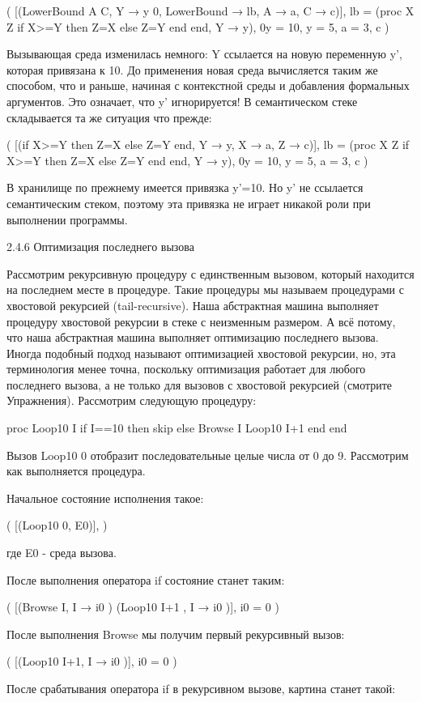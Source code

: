 ( [({LowerBound A C}, {Y → y 0, LowerBound → lb, A → a, C → c})],
{ lb = (proc { X Z} if X>=Y then Z=X else Z=Y end end, {Y → y}),
0y = 10, y = 5, a = 3, c} )

Вызывающая среда изменилась немного: Y ссылается на новую переменную y', которая привязана к 10. До применения новая среда вычисляется таким же способом, что и раньше, начиная с контекстной среды и добавления формальных аргументов. Это означает, что y' игнорируется! В семантическом стеке складывается та же ситуация что прежде:

( [(if X>=Y then Z=X else Z=Y end, {Y → y, X → a, Z → c})],
{ lb = (proc { X Z} if X>=Y then Z=X else Z=Y end end, {Y → y}),
0y = 10, y = 5, a = 3, c} )

В хранилище по прежнему имеется привязка y'=10. Но y' не ссылается семантическим стеком, поэтому эта привязка не играет никакой роли при выполнении программы.

2.4.6 Оптимизация последнего вызова

Рассмотрим рекурсивную процедуру с единственным вызовом, который находится на последнем месте в процедуре. Такие процедуры мы называем процедурами с хвостовой рекурсией (tail-recursive). Наша абстрактная машина выполняет процедуру хвостовой рекурсии в стеке с неизменным размером. А всё потому, что наша абстрактная машина выполняет оптимизацию последнего вызова. Иногда подобный подход называют оптимизацией хвостовой рекурсии, но, эта терминология менее точна, поскольку оптимизация работает для любого последнего вызова, а не только для вызовов с хвостовой рекурсией (смотрите Упражнения). Рассмотрим следующую процедуру:

proc {Loop10 I}
if I==10 then skip
else
{Browse I}
{Loop10 I+1}
end
end

Вызов {Loop10 0} отобразит последовательные целые числа от 0 до 9. Рассмотрим как выполняется процедура.

Начальное состояние исполнения такое:

( [({Loop10 0}, E0)],
 )

где E0 - среда вызова.

После выполнения оператора if состояние станет таким:

( [({Browse I}, {I → i0 }) ({Loop10 I+1} , {I → i0 })],
{i0 = 0}  )

После выполнения Browse мы получим первый рекурсивный вызов:

( [({Loop10 I+1}, {I → i0 })],
{i0 = 0}  )

После срабатывания оператора if в рекурсивном вызове, картина станет такой:

